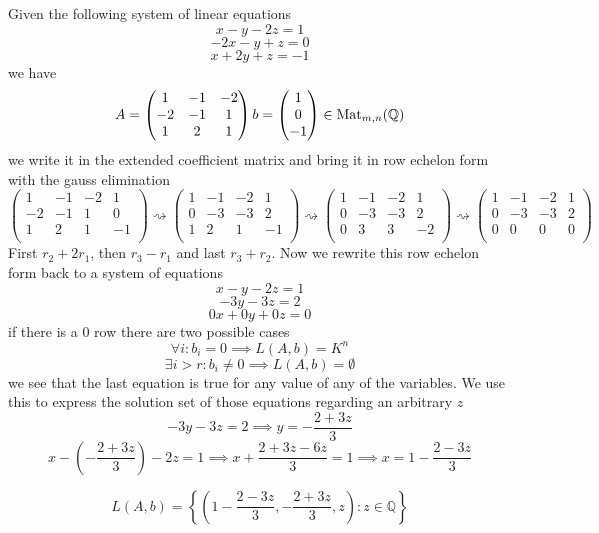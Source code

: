 \begin{example}
   Given the following system of linear equations
   \[x - y - 2z = 1\]
   \[-2x - y + z = 0\]
   \[x + 2y + z = -1\]
   we have
   \[A = \begin{pmatrix}
         1  & -1 & -2 \\
         -2 & -1 &  1 \\
         1  &  2 &  1 \\
      \end{pmatrix}
      b = \begin{pmatrix} 1 \\ 0 \\ -1\end{pmatrix} \in \operatorname{Mat}_{m,n}(\mathbb{Q})
   \]
   we write it in the extended coefficient matrix and bring it in row echelon form with the gauss elimination
   \[\begin{pmatrix}
         1  & -1 & -2 &  1 \\
         -2 & -1 &  1 &  0 \\
         1  &  2 &  1 & -1 \\
   \end{pmatrix} \rightsquigarrow \begin{pmatrix}
         1  & -1 & -2 &  1 \\
         0 & -3 &  -3 &  2 \\
         1  &  2 &  1 & -1 \\
   \end{pmatrix} \rightsquigarrow \begin{pmatrix}
         1 & -1 & -2 &  1 \\
         0 & -3 & -3 &  2 \\
         0 &  3 &  3 & -2 \\
   \end{pmatrix} \rightsquigarrow \begin{pmatrix}
         1 & -1 & -2 & 1 \\
         0 & -3 & -3 & 2 \\
         0 &  0 &  0 & 0 \\
   \end{pmatrix}\]
   First \(r_2 + 2 r_1\), then \(r_3 - r_1\) and last \(r_3 + r_2\).
   Now we rewrite this row echelon form back to a system of equations
   \[x - y - 2z = 1\]
   \[-3y - 3z = 2\]
   \[0x + 0y + 0z = 0\]
   if there is a 0 row there are two possible cases
   \[\forall i: b_i = 0 \implies L(A, b) = K^n\]
   \[\exists i > r: b_i \neq 0 \implies L(A, b) = \emptyset\]
   we see that the last equation is true for any value of any of the variables.
   We use this to express the solution set of those equations regarding an arbitrary \(z\)
   \[-3y - 3z = 2 \implies y = -\frac{2 + 3z}{3}\]
   \[x - \left(-\frac{2 + 3z}{3}\right) - 2z = 1 \implies x + \frac{2 + 3z - 6z}{3} = 1 \implies x = 1 - \frac{2 - 3z}{3}\]

   \[L(A, b) = \left\{\left(1 - \frac{2 - 3z}{3}, -\frac{2 + 3z}{3}, z\right): z \in \mathbb{Q}\right\}\]
\end{example}

